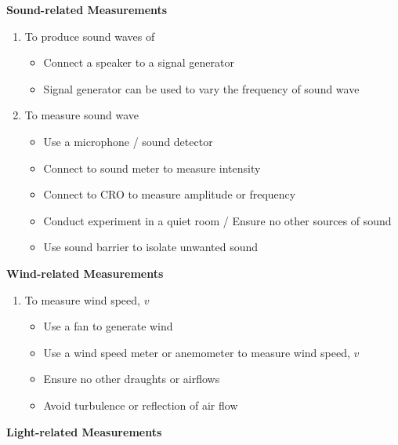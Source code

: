 \documentclass{article}
\begin{document}
\begin{flushleft}
\textbf{Sound-related Measurements}
\end{flushleft}
\begin{enumerate}
    \item To produce sound waves of
    \begin{itemize}
        \item  Connect a speaker to a signal generator
        \item Signal generator can be used to vary the frequency of sound wave
    \end{itemize}
    
    \item To measure sound wave
    \begin{itemize}
        \item Use a microphone / sound detector 
        \item Connect to sound meter to measure intensity
        \item Connect to CRO to measure amplitude or frequency
        \item Conduct experiment in a quiet room / Ensure no other sources of sound
        \item Use sound barrier to isolate unwanted sound
    \end{itemize}
\end{enumerate} 
\begin{flushleft}
\textbf{Wind-related Measurements}
\end{flushleft}
\begin{enumerate}
    \item To measure wind speed, $v$
    \begin{itemize}
        \item Use a fan to generate wind
        \item  Use a wind speed meter or anemometer to measure wind speed, $v$
        \item  Ensure no other draughts or airflows
        \item Avoid turbulence or reflection of air flow
    \end{itemize}
\end{enumerate}

\begin{flushleft}
\textbf{Light-related Measurements}
\end{flushleft}
\end{document}
